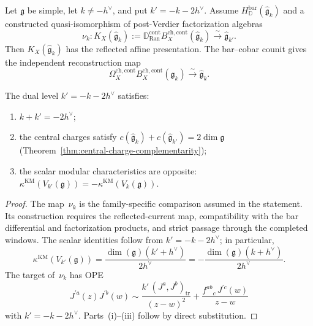 \begin{corollary}
\label{cor:level-shifting-part1}
Let $\mathfrak g$ be simple, let $k\neq-h^\vee$, and put
$k'=-k-2h^\vee$. Assume $H_{\mathbb D}^{\mathrm{bar}}
(\widehat{\mathfrak g}_k)$ and a constructed quasi-isomorphism of
post-Verdier factorization algebras
\begin{equation}\label{eq:level-shifting-part1}
\nu_k\colon
K_X(\widehat{\mathfrak g}_k)
:=
\mathbb D_{\operatorname{Ran}}^{\mathrm{cont}}
B_X^{\mathrm{ch,cont}}(\widehat{\mathfrak g}_k)
\xrightarrow{\sim}
\widehat{\mathfrak g}_{k'}.
\end{equation}
Then $K_X(\widehat{\mathfrak g}_k)$ has the reflected affine
presentation.  The bar--cobar counit gives the independent
reconstruction map
\[
\Omega_X^{\mathrm{ch,cont}}
B_X^{\mathrm{ch,cont}}(\widehat{\mathfrak g}_k)
\xrightarrow{\sim}\widehat{\mathfrak g}_k.
\]

The dual level $k' = -k - 2h^\vee$ satisfies:
\begin{enumerate}[label=\textup{(\roman*)}]
\item $k + k' = -2h^\vee$;
\item the central charges satisfy $c(\widehat{\mathfrak{g}}_k) + c(\widehat{\mathfrak{g}}_{k'}) = 2\dim\mathfrak{g}$ \textup{(}Theorem~\ref{thm:central-charge-complementarity}\textup{)};
\item the scalar modular characteristics are opposite:
\(\kappa^{\mathrm{KM}}(V_{k'}(\mathfrak g))
=-\kappa^{\mathrm{KM}}(V_k(\mathfrak g))\).
\end{enumerate}
\end{corollary}

\begin{proof}
The map~$\nu_k$ is the family-specific comparison assumed in the
statement.  Its construction requires the reflected-current map,
compatibility with the bar differential and factorization products,
and strict passage through the completed windows.  The scalar
identities follow from $k'=-k-2h^\vee$; in particular,
\[
\kappa^{\mathrm{KM}}(V_{k'}(\mathfrak g))
=\frac{\dim(\mathfrak g)(k'+h^\vee)}{2h^\vee}
=-\frac{\dim(\mathfrak g)(k+h^\vee)}{2h^\vee}.
\]
The target of~$\nu_k$ has OPE
\[
J^{\prime a}(z) J^{\prime b}(w) \sim
\frac{k'\,(J^a, J^b)_{\mathrm{tr}}}{(z-w)^2}
+ \frac{f^{ab}{}_c\, J^{\prime c}(w)}{z-w}
\]
with $k' = -k - 2h^\vee$. Parts~(i)--(iii) follow by
direct substitution.
\end{proof}

